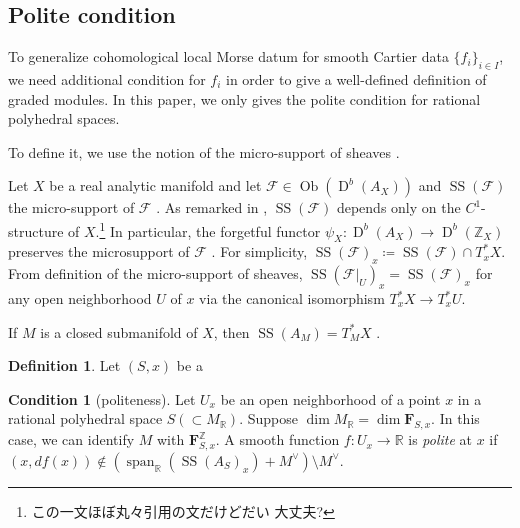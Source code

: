 \documentclass[a4paper,dvipdfmx,reqno,12pt]{amsart}
\theoremstyle{definition}
\newtheorem{Def}[Thm]{Definition}
\newtheorem{Rmk}[Thm]{Remark}
\newtheorem{Cond}[Thm]{Condition}
\newcommand{\deq}{\coloneqq}
\newcommand{\R}{\mathbb{R}}%
\newcommand{\Z}{\mathbb{Z}}%
\newcommand{\mcal}[1]{\mathcal{#1}}%
\newcommand{\opn}[1]{\operatorname{#1}}
\numberwithin{equation}{section}
\begin{document}
\subsection{Polite condition}

To generalize cohomological local Morse datum for
smooth Cartier data $\{f_i\}_{i\in I}$, we
need additional condition for $f_i$ in order 
to give a well-defined definition of graded modules.
In this paper, we only gives the polite condition for 
rational polyhedral spaces.

To define it, we use the notion of the micro-support of
sheaves \cite[Chapter V]{MR1299726}.

Let $X$ be a real analytic manifold and let
$\mcal{F}\in\opn{Ob}(\opn{D}^{b}(A_X))$ and
$\opn{SS}(\mcal{F})$ the micro-support of $\mcal{F}$
\cite[Definition 5.1.2]{MR1299726}.
As remarked in \cite[Remark 5.1.6]{MR1299726},
$\opn{SS}(\mcal{F})$ depends only on the 
$C^{1}$-structure of $X$.\footnote{この一文ほぼ丸々引用の文だけどだい
大丈夫?}
In particular, 
the forgetful functor 
$\psi_X \colon \opn{D}^{b}(A_X)\to \opn{D}^{b}(\Z_X)$
preserves the microsupport of $\mcal{F}$ 
\cite[Remark 5.1.5]{MR1299726}.
For simplicity,
$\opn{SS}(\mcal{F})_x\deq \opn{SS}(\mcal{F}) \cap T^{*}_x X$.
From definition of the micro-support of sheaves, 
$\opn{SS}(\mcal{F}|_{U})_x=\opn{SS}(\mcal{F})_x$
for any open neighborhood $U$ of $x$ via the canonical 
isomorphism $T^{*}_xX\to T^{*}_xU$.

If $M$ is a closed submanifold of $X$, then
$\opn{SS}(A_M)=T^{*}_M X$ \cite[Proposition 5.3.2]{MR1299726}.

\begin{Def}
Let $(S,x)$ be a 
\end{Def}

\begin{Cond}[{politeness}] \label{cond: polite}
Let $U_x$ be an open neighborhood of a point $x$ in a rational polyhedral
space $S (\subset M_{\R})$. 
Suppose $\dim M_{\R}=\dim \mathbf{F}_{S,x}$. In this case,
we can identify $M$ with $\mathbf{F}_{S,x}^{\Z}$.
A smooth function $f\colon U_x \to \R$ is \emph{polite} at $x$ 
if $(x,df(x))\notin (\opn{span}_{\R}(\opn{SS}(A_S)_x)+M^{\vee})\setminus M^{\vee}$.
\end{Cond}

\end{document}
